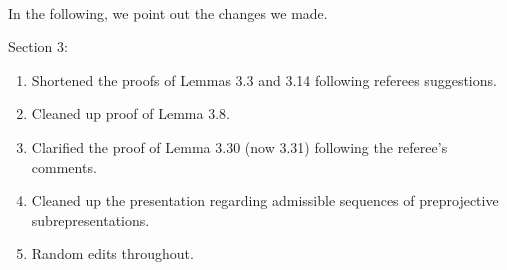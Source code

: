 \documentclass[titlepage,11pt,a4paper]{{scrartcl}}
\begin{document}
\pagestyle{empty}


\\



\noindent In the following, we point out the changes we made.

Section 3:
\renewcommand{\labelenumi}{(\arabic{enumi})}
\begin{enumerate}
  \item Shortened the proofs of Lemmas 3.3 and 3.14 following referees suggestions.
  \item Cleaned up proof of Lemma 3.8.
  \item Clarified the proof of Lemma 3.30 (now 3.31) following the referee's comments.
  \item Cleaned up the presentation regarding admissible sequences of preprojective subrepresentations.
  \item Random edits throughout.
\end{enumerate}
\end{document}
